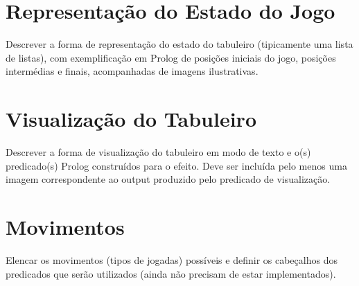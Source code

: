 \documentclass[a4paper]{article}
\begin{document}
\section{Representação do Estado do Jogo}

Descrever a forma de representação do estado do tabuleiro (tipicamente uma lista de listas), com exemplificação em Prolog de posições iniciais do jogo, posições intermédias e finais, acompanhadas de imagens ilustrativas.


\section{Visualização do Tabuleiro}

Descrever a forma de visualização do tabuleiro em modo de texto e o(s) predicado(s) Prolog construídos para o efeito.
Deve ser incluída pelo menos uma imagem correspondente ao output produzido pelo predicado de visualização.


\section{Movimentos}

Elencar os movimentos (tipos de jogadas) possíveis e definir os cabeçalhos dos predicados que serão utilizados (ainda não precisam de estar implementados).
\end{document}
